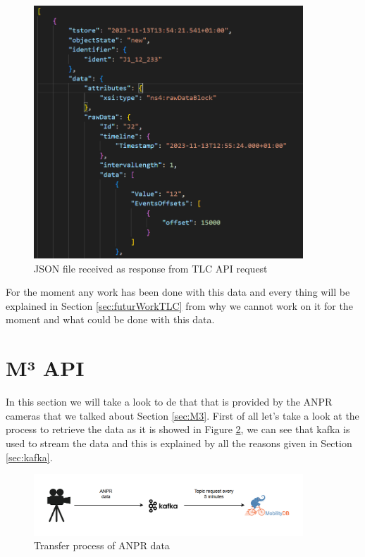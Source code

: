 \documentclass[12pt]{report}
\begin{document}
	\begin{center}
		\begin{figure}
			\centering
			\includegraphics[width=0.9\textwidth]{images/ResponseJSONTLC.png}
			\caption{JSON file received as response from TLC API request}
			\label{ResponseJSONTLC}
		\end{figure}
	\end{center}
	
	
	For the moment any work has been done with this data and every thing will be explained in Section \ref{sec:futurWorkTLC} from why we cannot work on it for the moment and what could be done with this data.
	
	\section{M³ API}
	\label{sec:dataM3}
	
	In this section we will take a look to de that that is provided by the ANPR cameras that we talked about Section \ref{sec:M3}. First of all let's take a look at the process to retrieve the data as it is showed in Figure \ref{AnprDataTransfer}, we can see that kafka is  used to stream the data and this is explained by all the reasons given in Section \ref{sec:kafka}. 
	
	\begin{center}
		\begin{figure}
			\centering
			\includegraphics[width=0.9\textwidth]{images/AnprDataTransfer.png}
			\caption{Transfer process of ANPR data}
			\label{AnprDataTransfer}
		\end{figure}
	\end{center}
	
\end{document}
